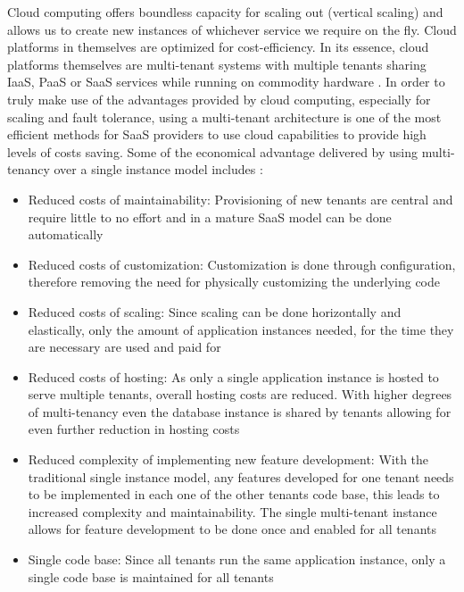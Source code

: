 Cloud computing offers boundless capacity for scaling out (vertical scaling) and allows us to create new instances of whichever service we require on the fly. Cloud platforms in themselves are optimized for cost-efficiency. In its essence, cloud platforms themselves are multi-tenant systems with multiple tenants sharing IaaS, PaaS or SaaS services while running on commodity hardware \cite{Wilder2012-so}. In order to truly make use of the advantages provided by cloud computing, especially for scaling and fault tolerance, using a multi-tenant architecture is one of the most efficient methods for SaaS providers to use cloud capabilities to provide high levels of costs saving.
Some of the economical advantage delivered by using multi-tenancy over a single instance model includes \cite{Betts2012-ad}:
\begin{itemize}
\item Reduced costs of maintainability: Provisioning of new tenants are central and require little to no effort and in a mature SaaS model can be done automatically
\item Reduced costs of customization: Customization is done through configuration, therefore removing the need for physically customizing the underlying code
\item Reduced costs of scaling: Since scaling can be done horizontally and elastically, only the amount of application instances needed, for the time they are necessary are used and paid for
\item Reduced costs of hosting: As only a single application instance is hosted to serve multiple tenants, overall hosting costs are reduced. With higher degrees of multi-tenancy even the database instance is shared by tenants allowing for even further reduction in hosting costs
\item Reduced complexity of implementing new feature development: With the traditional single instance model, any features developed for one tenant needs to be implemented in each one of the other tenants code base, this leads to increased complexity and maintainability. The single multi-tenant instance allows for feature development to be done once and enabled for all tenants
\item Single code base: Since all tenants run the same application instance, only a single code base is maintained for all tenants
\end{itemize}


